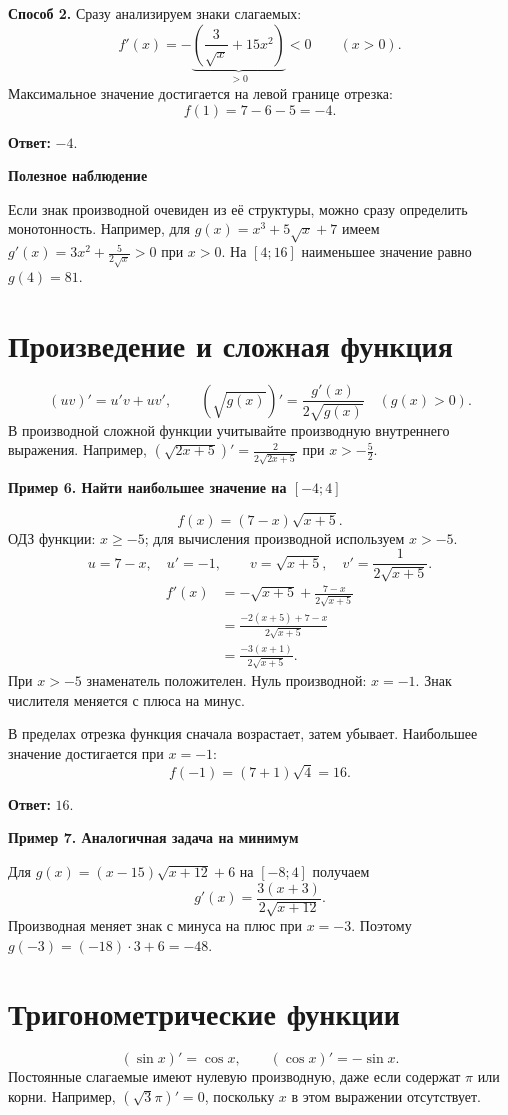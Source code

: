\documentclass[a4paper,12pt]{article}
\newcommand{\topic}[1]{\section{\textcolor{darkaccent}{#1}}}
\newcommand{\ex}[1]{\par\medskip\textbf{#1}\par\smallskip}
\newcommand{\key}[1]{\par\smallskip\textcolor{darkaccent}{\textbf{#1}}\par\smallskip}
\newcommand{\ans}[1]{\par\textbf{Ответ:} $#1$.}
\begin{document}
\textbf{Способ 2.} Сразу анализируем знаки слагаемых:
\[f'(x)=-\underbrace{\left(\frac3{\sqrt{x}}+15x^2\right)}_{>0}<0\qquad(x>0).\]
Максимальное значение достигается на левой границе отрезка:
\[f(1)=7-6-5=-4.\]
\ans{-4}
\key{Полезное наблюдение}
Если знак производной очевиден из её структуры, можно сразу определить монотонность. Например, для $g(x)=x^3+5\sqrt{x}+7$ имеем $g'(x)=3x^2+\frac5{2\sqrt{x}}>0$ при $x>0$. На $[4;16]$ наименьшее значение равно $g(4)=81$.
\clearpage
\topic{Произведение и сложная функция}
\[ (uv)'=u'v+uv',\qquad (\sqrt{g(x)})'=\frac{g'(x)}{2\sqrt{g(x)}}\quad(g(x)>0).\]
В производной сложной функции учитывайте производную внутреннего выражения. Например, $(\sqrt{2x+5})'=\frac{2}{2\sqrt{2x+5}}$ при $x> -\frac52$.
\ex{Пример 6. Найти наибольшее значение на $[-4;4]$}
\[f(x)=(7-x)\sqrt{x+5}.\]
ОДЗ функции: $x\ge-5$; для вычисления производной используем $x>-5$.
\[u=7-x,\quad u'=-1,\qquad v=\sqrt{x+5},\quad v'=\frac1{2\sqrt{x+5}}.\]
\begin{align*}
f'(x)&=-\sqrt{x+5}+\frac{7-x}{2\sqrt{x+5}}\\
&=\frac{-2(x+5)+7-x}{2\sqrt{x+5}}\\
&=\frac{-3(x+1)}{2\sqrt{x+5}}.
\end{align*}
При $x>-5$ знаменатель положителен. Нуль производной: $x=-1$. Знак числителя меняется с плюса на минус.
\begin{center}
\end{center}
В пределах отрезка функция сначала возрастает, затем убывает. Наибольшее значение достигается при $x=-1$:
\[f(-1)=(7+1)\sqrt{4}=16.\]
\ans{16}
\ex{Пример 7. Аналогичная задача на минимум}
Для $g(x)=(x-15)\sqrt{x+12}+6$ на $[-8;4]$ получаем
\[g'(x)=\frac{3(x+3)}{2\sqrt{x+12}}.\]
Производная меняет знак с минуса на плюс при $x=-3$. Поэтому $g(-3)=(-18)\cdot3+6=-48$.
\clearpage
\topic{Тригонометрические функции}
\[ (\sin x)'=\cos x,\qquad (\cos x)'=-\sin x.\]
Постоянные слагаемые имеют нулевую производную, даже если содержат $\pi$ или корни. Например, $(\sqrt3\pi)'=0$, поскольку $x$ в этом выражении отсутствует.
\end{document}
